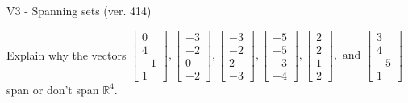 \begin{exercise}
  \begin{exerciseTitle}V3 - Spanning sets (ver. 414)\end{exerciseTitle}
  \begin{exerciseStatement}
    Explain why the vectors \(\left[\begin{array}{r}
0 \\
4 \\
-1 \\
1
\end{array}\right] , \left[\begin{array}{r}
-3 \\
-2 \\
0 \\
-2
\end{array}\right] , \left[\begin{array}{r}
-3 \\
-2 \\
2 \\
-3
\end{array}\right] , \left[\begin{array}{r}
-5 \\
-5 \\
-3 \\
-4
\end{array}\right] , \left[\begin{array}{r}
2 \\
2 \\
1 \\
2
\end{array}\right] , \text{ and } \left[\begin{array}{r}
3 \\
4 \\
-5 \\
1
\end{array}\right]\) span or don't span \(\mathbb{R}^4\). 
	



\end{exerciseStatement}
\end{exercise}
